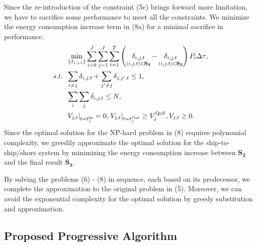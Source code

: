 \documentclass[journal]{IEEEtran}
\begin{document}
  Since the re-introduction of the constraint (5c) brings forward more limitation, we have to sacrifice some performance to meet all the constraints. 
  We minimize the energy consumption increase term in (8a) for a minimal sacrifice in performance. 
  \begin{subequations}
    \begin{align}
      &\mathop {\min }\limits_{\left\{ {{\delta _{i,j,t}}} \right\}}  {\sum\limits_{i = 0}^J {\sum\limits_{j = 1}^J {\sum\limits_{t = 1}^T {\left( {\mathop {{\delta _{i,j,t}}}\limits_{\left( {i,j,t} \right) \in {{\bf{S}}_{\bf{3}}}}  - \mathop {{\delta _{i,j,t}}}\limits_{\left( {i,j,t} \right) \in {{\bf{S}}_{\bf{2}}}} } \right){P_i}\Delta \tau } } } }  ,\\
      {s.t.} \;\; &\sum\limits_{i \ne j} {{{\delta _{i,j,t}}} } + \sum\limits_{j' \ne j} { {{\delta _{j,j',t}}} \le {1}} ,\\
      \;\;\;\;\;\; &\sum\limits_i {\sum\limits_j { {{\delta _{i,j,t}}} } } \le N ,\\
      \;\;\;\;\;\; &{{{\left. {{V_{j,t}}} \right|}_{t = t_j^{{\rm{In}}}}} = 0, \left. {{V_{j,t}}} \right|_{t = t_j^{{\rm{Out}}}}} \ge V_j^{\rm{QoS}}, {V_{j,t}} \ge 0.
    \end{align}
  \end{subequations}
  Since the optimal solution for the NP-hard problem in (8) requires polynomial complexity, we greedily approximate the optimal solution for the ship-to-ship/shore system by minimizing the energy consumption increase between ${{\mathbf{S}}_{\mathbf{2}}}$ and the final result ${{\mathbf{S}}_{\mathbf{3}}}$. %
  
  By solving the problems (6) - (8) in sequence, each based on its predecessor, we complete the approximation to the original problem in (5). Moreover, we can avoid the exponential complexity for the optimal solution by greedy substitution and approximation. 

   
    
  
   \subsection{Proposed Progressive Algorithm}
   
   
\end{document}
